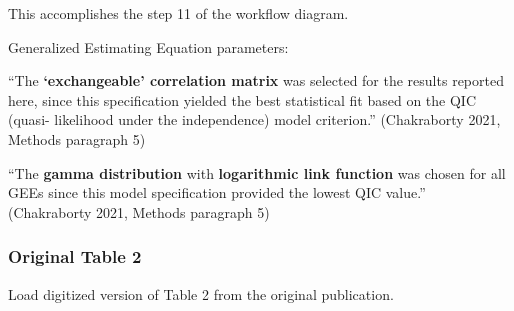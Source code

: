 \documentclass[
]{article}
\begin{document}
This accomplishes the step 11 of the workflow diagram.

Generalized Estimating Equation parameters:

``The \textbf{`exchangeable' correlation matrix} was selected for the
results reported here, since this specification yielded the best
statistical fit based on the QIC (quasi- likelihood under the
independence) model criterion.'' (Chakraborty 2021, Methods paragraph 5)

``The \textbf{gamma distribution} with \textbf{logarithmic link
function} was chosen for all GEEs since this model specification
provided the lowest QIC value.'' (Chakraborty 2021, Methods paragraph 5)

\hypertarget{original-table-2}{%
\subsubsection{Original Table 2}\label{original-table-2}}

Load digitized version of Table 2 from the original publication.
\end{document}
